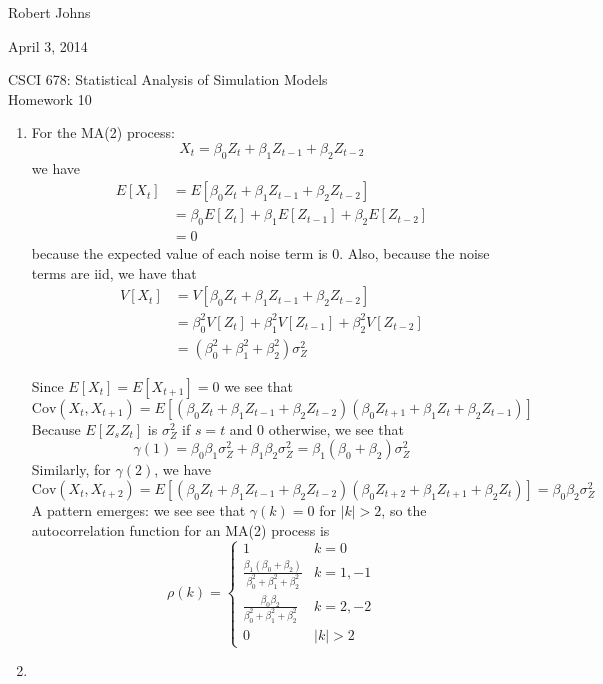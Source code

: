\documentclass[11pt]{article} %
\newcommand{\tr}{\textrm}
\newcommand{\cov}{\tr{Cov}}
\begin{document}
\hfill Robert Johns

\hfill April 3, 2014

\begin{center} {\Large CSCI 678: Statistical Analysis of Simulation Models}\\{\large Homework 10}\end{center}

\begin{enumerate}

\item For the MA(2) process:
$$X_t = \beta_0 Z_t + \beta_1 Z_{t-1} + \beta_2 Z_{t-2}$$
we have
\begin{align*}E[X_t] &= E[\beta_0 Z_t + \beta_1 Z_{t-1} + \beta_2 Z_{t-2}]\\
& = \beta_0 E[Z_t] + \beta_1 E[Z_{t-1}] + \beta_2 E[Z_{t-2}] \\
&= 0\end{align*}
because the expected value of each noise term is 0.  Also, because the noise terms are iid, we have that
\begin{align*}V[X_t] &= V[\beta_0 Z_t + \beta_1 Z_{t-1} + \beta_2 Z_{t-2}]\\
& = \beta_0^2 V[Z_t] + \beta_1^2 V[Z_{t-1}] + \beta_2^2 V[Z_{t-2}]\\
& = (\beta_0^2+\beta_1^2+\beta_2^2)\sigma_Z^2\end{align*}

Since $E[X_t] = E[X_{t+1}] =0$ we see that
$$\cov(X_t, X_{t+1}) = E[(\beta_0 Z_t + \beta_1 Z_{t-1} + \beta_2 Z_{t-2})(\beta_0 Z_{t+1} + \beta_1 Z_t + \beta_2 Z_{t-1})]$$
Because $E[Z_s Z_t]$ is $\sigma_Z^2$ if $s=t$ and $0$ otherwise, we see that
$$\gamma(1) = \beta_0\beta_1\sigma_Z^2 + \beta_1\beta_2\sigma_Z^2 = \beta_1(\beta_0+\beta_2)\sigma_Z^2$$
Similarly, for $\gamma(2)$, we have
$$\cov(X_t,X_{t+2}) = E[(\beta_0 Z_t + \beta_1 Z_{t-1} + \beta_2 Z_{t-2})(\beta_0 Z_{t+2} + \beta_1 Z_{t+1} + \beta_2 Z_t)] = \beta_0\beta_2\sigma_Z^2$$
A pattern emerges: we see see that $\gamma(k) = 0$ for $|k|>2$, so the autocorrelation function for an MA(2) process is
$$\rho(k) =\begin{cases}
1 &  k = 0 \\
\frac{\beta_1(\beta_0+\beta_2)}{\beta_0^2+\beta_1^2+\beta_2^2}       & k = 1, -1\\
\frac{\beta_0\beta_2}{\beta_0^2+\beta_1^2+\beta_2^2} &k = 2, -2\\
0 & |k| > 2
\end{cases}$$

\item


\end{enumerate}
\end{document}
